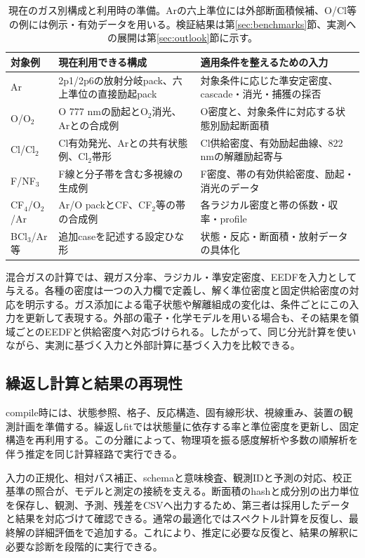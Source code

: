 \begin{table}[htbp]
\centering\small
\begin{tabularx}{\linewidth}{p{25mm}YY}
\toprule
対象例 & 現在利用できる構成 & 適用条件を整えるための入力 \\
\midrule
Ar & 2p1/2p6の放射分岐pack、六上準位の直接励起pack & 対象条件に応じた準安定密度、cascade・消光・捕獲の採否 \\
O/O$_2$ & O 777 nmの励起とO$_2$消光、Arとの合成例 & O密度と、対象条件に対応する状態別励起断面積 \\
Cl/Cl$_2$ & Cl有効発光、Arとの共有状態例、Cl$_2$帯形 & Cl供給密度、有効励起曲線、822 nmの解離励起寄与 \\
F/NF$_3$ & F線と分子帯を含む多視線の生成例 & F密度、帯の有効供給密度、励起・消光のデータ \\
CF$_4$/O$_2$/Ar & Ar/O packとCF、CF$_2$等の帯の合成例 & 各ラジカル密度と帯の係数・収率・profile \\
BCl$_3$/Ar等 & 追加caseを記述する設定ひな形 & 状態・反応・断面積・放射データの具体化 \\
\bottomrule
\end{tabularx}
\caption{現在のガス別構成と利用時の準備。Arの六上準位には外部断面積候補、O/Cl等の例には例示・有効データを用いる。検証結果は第\ref{sec:benchmarks}節、実測への展開は第\ref{sec:outlook}節に示す。}
\label{tab:gases}
\end{table}

混合ガスの計算では、親ガス分率、ラジカル・準安定密度、EEDFを入力として与える。各種の密度は一つの入力欄で定義し、解く準位密度と固定供給密度の対応を明示する。ガス添加による電子状態や解離組成の変化は、条件ごとにこの入力を更新して表現する。外部の電子・化学モデルを用いる場合も、その結果を領域ごとのEEDFと供給密度へ対応づけられる。したがって、同じ分光計算を使いながら、実測に基づく入力と外部計算に基づく入力を比較できる。

\subsection{繰返し計算と結果の再現性}
compile時には、状態参照、格子、反応構造、固有線形状、視線重み、装置の観測計画を準備する。繰返しfitでは状態量に依存する率と準位密度を更新し、固定構造を再利用する。この分離によって、物理項を振る感度解析や多数の順解析を伴う推定を同じ計算経路で実行できる。

入力の正規化、相対パス補正、schemaと意味検査、観測IDと予測の対応、校正基準の照合が、モデルと測定の接続を支える。断面積のhashと成分別の出力単位を保存し、観測、予測、残差をCSVへ出力するため、第三者は採用したデータと結果を対応づけて確認できる。通常の最適化ではスペクトル計算を反復し、最終解の詳細評価をで追加する。これにより、推定に必要な反復と、結果の解釈に必要な診断を段階的に実行できる。
